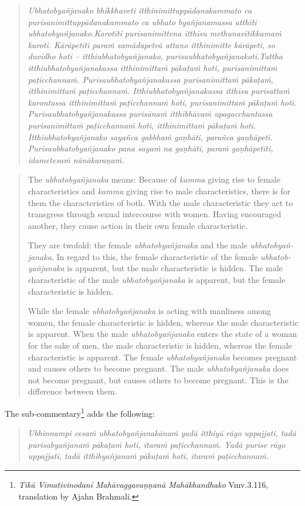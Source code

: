 \begin{quote}
{\em Ubhatobyañjanako bhikkhaveti itthinimittuppādanakammato ca purisanimittuppādanakammato ca ubhato byañjanamassa atthīti ubhatobyañjanako.Karotīti purisanimittena itthīsu methunavītikkamaṁ karoti. Kārāpetīti paraṁ samādapetvā attano itthinimitte kārāpeti, so duvidho hoti – itthiubhatobyañjanako, purisaubhatobyañjanakoti.Tattha itthiubhatobyañjanakassa itthinimittaṁ pākaṭaṁ hoti, purisanimittaṁ paṭicchannaṁ. Purisaubhatobyañjanakassa purisanimittaṁ pākaṭaṁ, itthinimittaṁ paṭicchannaṁ. Itthiubhatobyañjanakassa itthīsu purisattaṁ karontassa itthinimittaṁ paṭicchannaṁ hoti, purisanimittaṁ pākaṭaṁ hoti. Purisaubhatobyañjanakassa purisānaṁ itthibhāvaṁ upagacchantassa purisanimittaṁ paṭicchannaṁ hoti, itthinimittaṁ pākaṭaṁ hoti. Itthiubhatobyañjanako sayañca gabbhaṁ gaṇhāti, parañca gaṇhāpeti. Purisaubhatobyañjanako pana sayaṁ na gaṇhāti, paraṁ gaṇhāpetīti, idametesaṁ nānākaraṇaṁ.}
\end{quote}

\begin{quote}
The {\em ubhatob­yañ­janaka} means: Because of {\em kamma} giving rise to female characteristics and {\em kamma} giving rise to male characteristics, there is for them the characteristics of both. With the male characteristic they act to transgress through sexual intercourse with women. Having encouraged another, they cause action in their own female characteristic. 

They are twofold: the female {\em ubhatob­yañ­janaka} and the male {\em ubhatob­yañ­janaka}. In regard to this, the female characteristic of the female {\em ubhatob­yañ­janaka} is apparent, but the male characteristic is hidden. The male characteristic of the male {\em ubhatob­yañ­janaka} is apparent, but the female characteristic is hidden. 

While the female {\em ubhatob­yañ­janaka} is acting with manliness among women, the female characteristic is hidden, whereas the male characteristic is apparent. 
When the male {\em ubhatob­yañ­janaka} enters the state of a woman for the sake of men, the male characteristic is hidden, whereas the female characteristic is apparent. 
The female {\em ubhatob­yañ­janaka} becomes pregnant and causes others to become pregnant. The male {\em ubhatob­yañ­janaka} does not become pregnant, but causes others to become pregnant. This is the difference between them.
\end{quote}

The sub-commentary\footnote{{\em Tikā Vimativinodanī Mahāvaggavaṇṇanā Mahākhandhako} Vmv.3.116, translation by Ajahn Brahmali.} adds the following: 
\begin{quote}
{\em Ubhinnampi cesaṁ ubhatobyañjanakānaṁ yadā itthiyā rāgo uppajjati, tadā purisabyañjanaṁ pākaṭaṁ hoti, itaraṁ paṭicchannaṁ. Yadā purise rāgo uppajjati, tadā itthibyañjanaṁ pākaṭaṁ hoti, itaraṁ paṭicchannaṁ.}
\end{quote}

